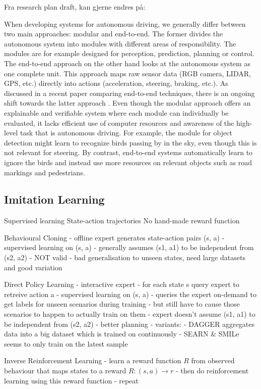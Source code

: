 Fra research plan draft, kan gjerne endres på:

When developing systems for autonomous driving, we generally differ between two main approaches: modular and end-to-end. The former divides the autonomous system into modules with different areas of responsibility. The modules are for example designed for perception, prediction, planning or control. The end-to-end approach on the other hand looks at the autonomous system as one complete unit. This approach maps raw sensor data (RGB camera, LIDAR, GPS, etc.) directly into actions (acceleration, steering, braking, etc.). As discussed in a recent paper comparing end-to-end techniques, there is an ongoing shift towards the latter approach \cite{survey-on-end-to-end-techniques}. Even though the modular approach offers an explainable and verifiable system where each module can individually be evaluated, it lacks efficient use of computer resources and awareness of the high-level task that is autonomous driving. For example, the module for object detection might learn to recognize birds passing by in the sky, even though this is not relevant for steering. By contrast, end-to-end systems automatically learn to ignore the birds and instead use more resources on relevant objects such as road markings and pedestrians.

\subsection{Imitation Learning}

Supervised learning
State-action trajectories
No hand-made reward function

Behavioural Cloning
- offline expert generates state-action pairs (s, a)
- supervised learning on (s, a)
- generally assumes (s1, a1) to be independent from (s2, a2) - NOT valid
    - bad generalisation to unseen states, need large datasets and good variation

Direct Policy Learning
- interactive expert
- for each state s query expert to retreive action a
  - supervised learning on (s, a)
- queries the expert on-demand to get labels for unseen scenarios during training
    - but still have to cause those scenarios to happen to actually train on them
- expert doesn't assume (s1, a1) to be independent from (s2, a2) - better planning
- variants:
    - DAGGER aggregates data into a big dataset which is trained on continuously
    - SEARN \& SMILe seems to only train on the latest sample

Inverse Reinforcement Learning
- learn a reward function $R$ from observed behaviour that maps states to a reward $R: (s, a) \rightarrow r$
- then do reinforcement learning using this reward function
- repeat 


